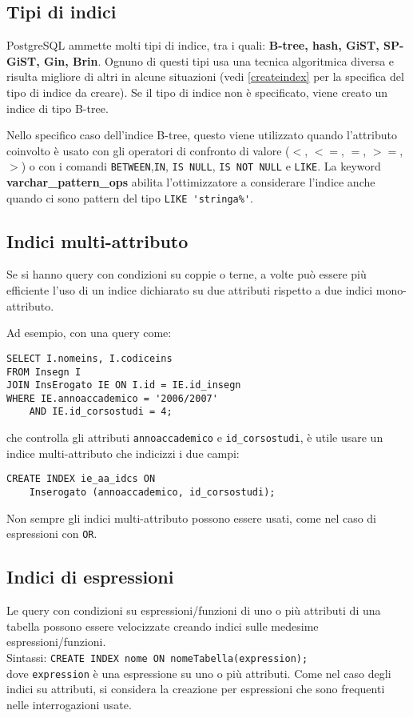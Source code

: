 \documentclass[a4paper, 10pt, titlepage]{article}
\begin{document}
	\subsection{Tipi di indici}
	PostgreSQL ammette molti tipi di indice, tra i quali: \textbf{B-tree, hash, GiST, SP-GiST, Gin, Brin}.
	Ognuno di questi tipi usa una tecnica algoritmica diversa e risulta migliore di altri in alcune situazioni (vedi \ref{createindex} per la specifica del tipo di indice da creare).
	Se il tipo di indice non è specificato, viene creato un indice di tipo B-tree.
	
	 Nello specifico caso dell'indice B-tree, questo viene utilizzato quando l'attributo coinvolto è usato con gli operatori di confronto di valore ($<$, $<=$, $=$, $>=$, $>$) o con i comandi \lstinline|BETWEEN|,\lstinline|IN|, \lstinline|IS NULL|, \lstinline|IS NOT NULL| e \lstinline|LIKE|.
	 La keyword \textbf{varchar\_pattern\_ops} abilita l’ottimizzatore a considerare l’indice anche quando ci sono pattern del tipo \lstinline|LIKE 'stringa%'|.
	 
	 \subsection{Indici multi-attributo}
	 Se si hanno query con condizioni su coppie o terne, a volte può essere più efficiente l'uso di un indice dichiarato su due attributi rispetto a due indici mono-attributo.
	 
	 Ad esempio, con una query come:
	 \begin{lstlisting}
SELECT I.nomeins, I.codiceins
FROM Insegn I
JOIN InsErogato IE ON I.id = IE.id_insegn
WHERE IE.annoaccademico = '2006/2007'
	AND IE.id_corsostudi = 4;
	 \end{lstlisting}
	 che controlla gli attributi \verb|annoaccademico| e \verb|id_corsostudi|, è utile usare un indice multi-attributo che indicizzi i due campi:
	 \begin{lstlisting}
CREATE INDEX ie_aa_idcs ON 
	Inserogato (annoaccademico,	id_corsostudi);
	 \end{lstlisting}
	 Non sempre gli indici multi-attributo possono essere usati, come nel caso di espressioni con \lstinline|OR|.
	 
	 \subsection{Indici di espressioni}
	 Le query con condizioni su espressioni/funzioni di uno o più attributi di una tabella possono essere velocizzate creando indici sulle medesime espressioni/funzioni.\\
Sintassi: \lstinline|CREATE INDEX nome ON nomeTabella(expression);|\\
dove \lstinline|expression| è una espressione su uno o più attributi.
Come nel caso degli indici su attributi, si considera la creazione per espressioni che sono frequenti nelle interrogazioni usate.
\end{document}
